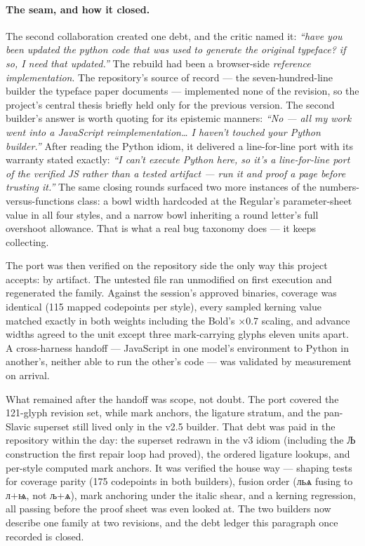 \documentclass[11pt]{article}
\newcommand{\cz}[1]{{\chu #1}}
\begin{document}
\paragraph{The seam, and how it closed.} The second collaboration created one debt, and the critic named it: \emph{``have you been updated the python code that was used to generate the original typeface? if so, I need that updated.''} The rebuild had been a browser-side \emph{reference implementation}. The repository's source of record — the seven-hundred-line builder the typeface paper documents — implemented none of the revision, so the project's central thesis briefly held only for the previous version. The second builder's answer is worth quoting for its epistemic manners: \emph{``No --- all my work went into a JavaScript reimplementation\ldots{} I haven't touched your Python builder.''} After reading the Python idiom, it delivered a line-for-line port with its warranty stated exactly: \emph{``I can't execute Python here, so it's a line-for-line port of the verified JS rather than a tested artifact — run it and proof a page before trusting it.''} The same closing rounds surfaced two more instances of the numbers-versus-functions class: a bowl width hardcoded at the Regular's parameter-sheet value in all four styles, and a narrow bowl inheriting a round letter's full overshoot allowance. That is what a real bug taxonomy does — it keeps collecting.

The port was then verified on the repository side the only way this project accepts: by artifact. The untested file ran unmodified on first execution and regenerated the family. Against the session's approved binaries, coverage was identical (115 mapped codepoints per style), every sampled kerning value matched exactly in both weights including the Bold's $\times$0.7 scaling, and advance widths agreed to the unit except three mark-carrying glyphs eleven units apart. A cross-harness handoff — JavaScript in one model's environment to Python in another's, neither able to run the other's code — was validated by measurement on arrival.

What remained after the handoff was scope, not doubt. The port covered the 121-glyph revision set, while mark anchors, the ligature stratum, and the pan-Slavic superset still lived only in the v2.5 builder. That debt was paid in the repository within the day: the superset redrawn in the v3 idiom (including the \cz{Љ} construction the first repair loop had proved), the ordered ligature lookups, and per-style computed mark anchors. It was verified the house way — shaping tests for coverage parity (175 codepoints in both builders), fusion order (\cz{льѧ} fusing to \cz{л}+\cz{ѩ}, not \cz{љ}+\cz{ѧ}), mark anchoring under the italic shear, and a kerning regression, all passing before the proof sheet was even looked at. The two builders now describe one family at two revisions, and the debt ledger this paragraph once recorded is closed.
\end{document}
